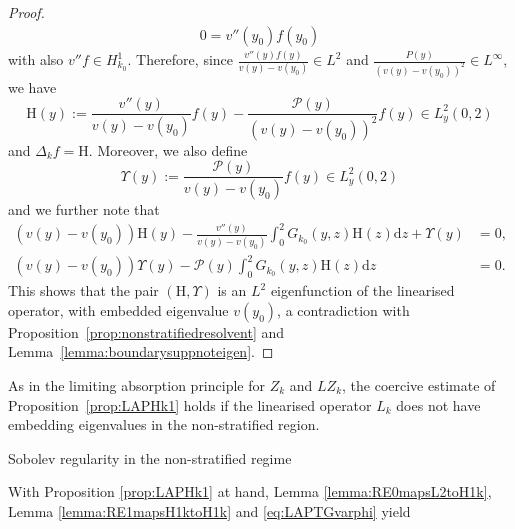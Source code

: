 \documentclass[11pt,reqno]{amsproc}
\makeatletter
\renewcommand\subsection{\@startsection{subsection}{2}%
\normalparindent{.5\linespacing\@plus.7\linespacing}{-.5em}
{\normalfont\bfseries}}
\theoremstyle{definition}
\numberwithin{equation}{section}
\renewcommand{\d}{\mathrm{d}}
\renewcommand{\P}{{\mathcal{P}}}
\makeatother
\begin{document}
\begin{proof}
\begin{align*}
0 = v''(y_0)f(y_0)
\end{align*}
with also $v''f\in H_{k_0}^1$. Therefore, since $\frac{v''(y)f(y)}{v(y) - v(y_0)}\in L^2$ and $\frac{P(y)}{(v(y) - v(y_0))^2}\in L^\infty$, we have \begin{equation}\label{eq:defHeigenfunction}
\mathrm{H}(y) := \frac{v''(y)}{v(y) - v(y_0)}f(y) - \frac{\P(y)}{(v(y) - v(y_0))^2}f(y)\in L^2_y(0,2)
\end{equation}
and $\Delta_k f = \mathrm H$. Moreover, we also define
\begin{equation}\label{eq:defUpsilon}
\Upsilon(y) := \frac{\mathcal{P}(y)}{v(y) - v(y_0)}f(y) \in L^2_y(0,2)
\end{equation}
and we further note that
\begin{equation}\label{eq:HUpsiloneigen}
\begin{split}
(v(y) - v(y_0)) \mathrm H(y) - \frac{v''(y)}{v(y) - v(y_0)}\int_0^2 G_{k_0}(y,z)\mathrm H(z) \d z  + \Upsilon(y) &= 0, \\
(v(y) - v(y_0))\Upsilon(y) - \mathcal{P}(y)\int_0^2 G_{k_0}(y,z)\mathrm H(z) \d z  &=0.
\end{split}
\end{equation}
This shows that the pair $(\mathrm H,\Upsilon)$ is an $L^2$ eigenfunction of the linearised operator, with embedded eigenvalue $v(y_0)$, a contradiction with Proposition~\ref{prop:nonstratifiedresolvent} and Lemma~\ref{lemma:boundarysuppnoteigen}.
\end{proof}

As in the limiting absorption principle for $Z_k$ and $LZ_k$, the coercive estimate of Proposition~\ref{prop:LAPHk1} holds if the linearised operator $L_k$ does not have embedding eigenvalues in the non-stratified region.

\subsection{Sobolev regularity in the non-stratified regime}

With Proposition \ref{prop:LAPHk1} at hand, Lemma \ref{lemma:RE0mapsL2toH1k}, Lemma \ref{lemma:RE1mapsH1ktoH1k} and \eqref{eq:LAPTGvarphi} yield
\end{document}
